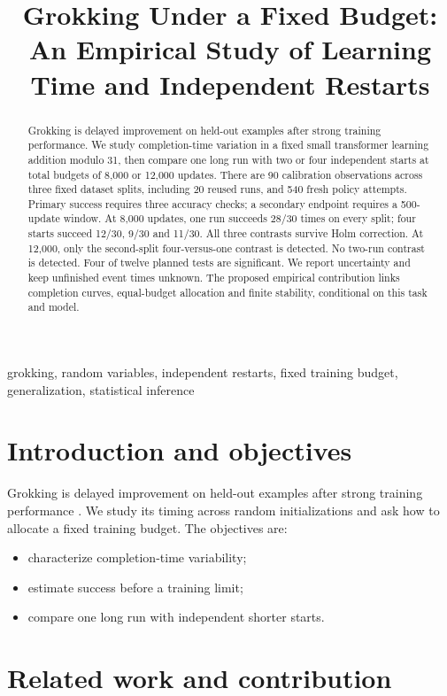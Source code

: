 \documentclass[conference,letterpaper]{IEEEtran}
\title{Grokking Under a Fixed Budget:\\An Empirical Study of Learning Time and Independent Restarts}
\author{
\IEEEauthorblockN{Vihaan Jinesh Jain}
\IEEEauthorblockA{25BYB0130}
\and
\IEEEauthorblockN{Kaashvi Goel}
\IEEEauthorblockA{25BYB0129}
\and
\IEEEauthorblockN{Gaurav Kansal}
\IEEEauthorblockA{25BYB0157}
}
\begin{document}
\raggedbottom
\maketitle
\begin{abstract}
Grokking is delayed improvement on held-out examples after strong training performance. We study completion-time variation in a fixed small transformer learning addition modulo 31, then compare one long run with two or four independent starts at total budgets of 8,000 or 12,000 updates. There are 90 calibration observations across three fixed dataset splits, including 20 reused runs, and 540 fresh policy attempts. Primary success requires three accuracy checks; a secondary endpoint requires a 500-update window. At 8,000 updates, one run succeeds 28/30 times on every split; four starts succeed 12/30, 9/30 and 11/30. All three contrasts survive Holm correction. At 12,000, only the second-split four-versus-one contrast is detected. No two-run contrast is detected. Four of twelve planned tests are significant. We report uncertainty and keep unfinished event times unknown. The proposed empirical contribution links completion curves, equal-budget allocation and finite stability, conditional on this task and model.
\end{abstract}

\begin{IEEEkeywords}grokking, random variables, independent restarts, fixed training budget, generalization, statistical inference\end{IEEEkeywords}

\section{Introduction and objectives}

Grokking is delayed improvement on held-out examples after strong training performance \cite{ref1}. We study its timing across random initializations and ask how to allocate a fixed training budget. The objectives are:
\begin{itemize}
\item characterize completion-time variability;
\item estimate success before a training limit;
\item compare one long run with independent shorter starts.
\end{itemize}

\section{Related work and contribution}
\end{document}
